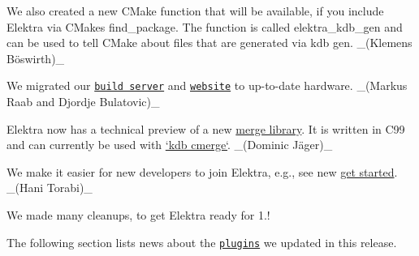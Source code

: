 We also created a new C\+Make function that will be available, if you include Elektra via C\+Make\textquotesingle{}s {\ttfamily find\+\_\+package}. The function is called {\ttfamily elektra\+\_\+kdb\+\_\+gen} and can be used to tell C\+Make about files that are generated via {\ttfamily kdb gen}. \+\_\+(Klemens Böswirth)\+\_\+


\begin{DoxyItemize}
\item We migrated our \href{https://build.libelektra.org}{\tt build server} and \href{https://www.libelektra.org}{\tt website} to up-\/to-\/date hardware. \+\_\+(\+Markus Raab and Djordje Bulatovic)\+\_\+
\item Elektra now has a technical preview of a new \hyperlink{doc_tutorials_cmerge_md}{merge library}. It is written in C99 and can currently be used with \hyperlink{doc_help_kdb-cmerge_md}{`kdb cmerge`}. \+\_\+(Dominic Jäger)\+\_\+
\item We make it easier for new developers to join Elektra, e.\+g., see new \hyperlink{doc_GETSTARTED_md}{get started}. \+\_\+(\+Hani Torabi)\+\_\+
\item We made many cleanups, to get Elektra ready for 1.!
\end{DoxyItemize}

The following section lists news about the \href{https://www.libelektra.org/plugins/readme}{\tt plugins} we updated in this release.


